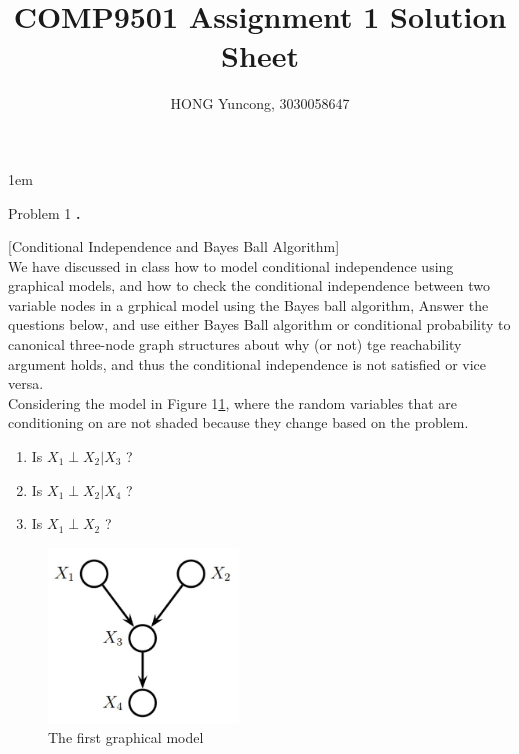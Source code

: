 \documentclass{article}
\newcounter{pcounter}                                   %
\newenvironment{problem}                                %
{                                                       %
    \color{gray}                                        %
    \stepcounter{pcounter}                              %
    \textbf{\arabic{pcounter}.}                         %
}{}                                                     %
\begin{document}
    \parindent 0in
    \parskip 1em
    \title{COMP9501 Assignment 1 Solution Sheet}
    \author{HONG Yuncong, 3030058647}
    \maketitle

    \begin{section}{Problem 1}
        \setcounter{pcounter}{0}
        \begin{problem}
            [Conditional Independence and Bayes Ball Algorithm]\\
            We have discussed in class how to model conditional independence using graphical models, and how to check the conditional independence between two variable nodes in a grphical model using the Bayes ball algorithm, Answer the questions below, and use either Bayes Ball algorithm or conditional probability to canonical three-node graph structures about why (or not) tge reachability argument holds, and thus the conditional independence is not satisfied or vice versa.\\
            Considering the model in Figure 1\ref{fig:m1}, where the random variables that are conditioning on are not shaded because they change based on the problem.
            \begin{enumerate}[label=(\alph*)]
                \item Is $X_1 \perp X_2 | X_3$ ?
                \item Is $X_1 \perp X_2 | X_4$ ?
                \item Is $X_1 \perp X_2$ ?
            \end{enumerate}
            \begin{figure}[H]
                \label{fig:m1}
                \centering
                \includegraphics[width=0.45\textwidth]{a2_p11_1}
                \caption{The first graphical model}
            \end{figure}


\end{problem}
\end{section}
\end{document}
